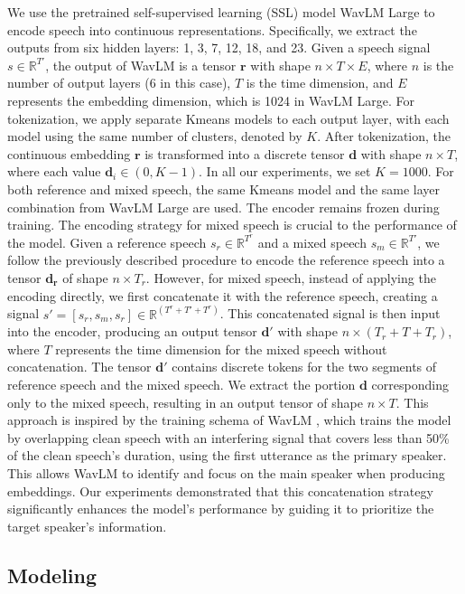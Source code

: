 \documentclass[conference]{IEEEtran}
\begin{document}
We use the pretrained self-supervised learning (SSL) model WavLM Large \cite{wavlm} to encode speech into continuous representations. Specifically, we extract the outputs from six hidden layers: 1, 3, 7, 12, 18, and 23. Given a speech signal \(s \in \mathbb{R}^{T'}\), the output of WavLM is a tensor \(\bm{r}\) with shape \(n \times T \times E\), where \(n\) is the number of output layers (6 in this case), \(T\) is the time dimension, and \(E\) represents the embedding dimension, which is 1024 in WavLM Large.  For tokenization, we apply separate Kmeans models to each output layer, with each model using the same number of clusters, denoted by \(K\). After tokenization, the continuous embedding \(\bm{r}\) is transformed into a discrete tensor \(\bm{d}\) with shape \(n \times T\), where each value \(\bm{d}_{i} \in (0, K-1) \). In all our experiments, we set \(K = 1000\). For both reference and mixed speech, the same Kmeans model and the same layer combination from WavLM Large are used. The encoder remains frozen during training.
The encoding strategy for mixed speech is crucial to the performance of the model. Given a reference speech \(s_r \in \mathbb{R}^{T^r}\) and a mixed speech \(s_m \in \mathbb{R}^{T'}\), we follow the previously described procedure to encode the reference speech into a tensor \(\bm{d_r}\) of shape \(n \times T_r\). However, for mixed speech, instead of applying the encoding directly, we first concatenate it with the reference speech, creating a signal \(s' = [s_r, s_m, s_r] \in \mathbb{R}^{(T^r + T' + T^r)}\). This concatenated signal is then input into the encoder, producing an output tensor \(\bm{d'}\) with shape \(n \times (T_r + T + T_r)\), where \(T\) represents the time dimension for the mixed speech without concatenation. The tensor \(\bm{d'}\) contains discrete tokens for the two segments of reference speech and the mixed speech. We extract the portion \(\bm{d}\) corresponding only to the mixed speech, resulting in an output tensor of shape \(n \times T\).
This approach is inspired by the training schema of WavLM \cite{wavlm}, which trains the model by overlapping clean speech with an interfering signal that covers less than 50\% of the clean speech's duration, using the first utterance as the primary speaker. This allows WavLM to identify and focus on the main speaker when producing embeddings. Our experiments demonstrated that this concatenation strategy significantly enhances the model's performance by guiding it to prioritize the target speaker's information.
\subsection{Modeling}
\end{document}
